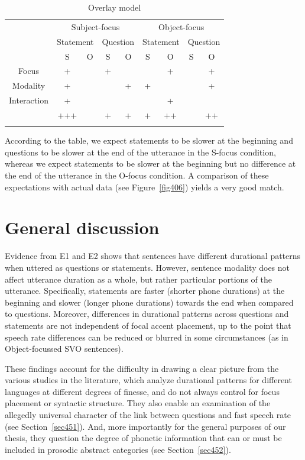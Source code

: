 \begin{table}[h]
\centering
\begin{tabular}{c  cc  cc  cc  cc}
\mytoprule
& \multicolumn{4}{c}{Subject-focus} & \multicolumn{4}{c}{Object-focus}\\
& \multicolumn{2}{c}{Statement} & \multicolumn{2}{c}{Question} & \multicolumn{2}{c}{Statement} & \multicolumn{2}{c}{Question}\\
& S & O & S & O & S & O & S & O\\
\midrule
Focus & + &   & + &   &   & + &   & + \\
Modality & + &   &   & + & + &   &   & + \\
Interaction & + &   &   &   &   & + &   &  \\
\midrule
& +++ & & + & + & + & ++ & & ++ \\
\mybottomrule
\end{tabular}
\caption{Overlay model}
\label{tab43}\end{table}

According to the table, we expect statements to be slower at the beginning and questions to be slower at the end of the utterance in the S-focus condition, whereas we expect statements to be slower at the beginning but no difference at the end of the utterance in the O-focus condition. A comparison of these expectations with actual data (see Figure~\ref{fig406}) yields a very good match.

\section{General discussion}\label{sec45}
Evidence from E1 and E2 shows that sentences have different durational patterns when uttered as questions or statements. However, sentence modality does not affect utterance duration as a whole, but rather particular portions of the utterance. Specifically, statements are faster (shorter phone durations) at the beginning and slower (longer phone durations) towards the end when compared to questions. Moreover, differences in durational patterns across questions and statements are not independent of focal accent placement, up to the point that speech rate differences can be reduced or blurred in some circumstances (as in Object-focussed SVO sentences). 

These findings account for the difficulty in drawing a clear picture from the various studies in the literature, which analyze durational patterns for different languages at different degrees of finesse, and do not always control for focus placement or syntactic structure. They also enable an examination of the allegedly universal character of the link between questions and fast speech rate (see Section~\ref{sec451}). And, more importantly for the general purposes of our thesis, they question the degree of phonetic information that can or must be included in prosodic abstract categories (see Section~\ref{sec452}).

